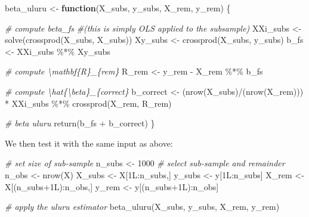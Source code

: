 \documentclass[
  12pt,
]{style/krantz}
\newenvironment{Shaded}{\begin{snugshade}}{\end{snugshade}}
\newcommand{\CommentTok}[1]{\textcolor[rgb]{0.56,0.35,0.01}{\textit{#1}}}
\newcommand{\ControlFlowTok}[1]{\textcolor[rgb]{0.13,0.29,0.53}{\textbf{#1}}}
\newcommand{\DecValTok}[1]{\textcolor[rgb]{0.00,0.00,0.81}{#1}}
\newcommand{\FunctionTok}[1]{\textcolor[rgb]{0.00,0.00,0.00}{#1}}
\newcommand{\NormalTok}[1]{#1}
\newcommand{\OtherTok}[1]{\textcolor[rgb]{0.56,0.35,0.01}{#1}}
\newcommand{\SpecialCharTok}[1]{\textcolor[rgb]{0.00,0.00,0.00}{#1}}
\begin{document}
\begin{Shaded}
\begin{Highlighting}[]
\NormalTok{beta\_uluru }\OtherTok{\textless{}{-}}
     \ControlFlowTok{function}\NormalTok{(X\_subs, y\_subs, X\_rem, y\_rem) \{}
          
          \CommentTok{\# compute beta\_fs }
          \CommentTok{\#(this is simply OLS applied to the subsample)}
\NormalTok{          XXi\_subs }\OtherTok{\textless{}{-}} \FunctionTok{solve}\NormalTok{(}\FunctionTok{crossprod}\NormalTok{(X\_subs, X\_subs))}
\NormalTok{          Xy\_subs }\OtherTok{\textless{}{-}} \FunctionTok{crossprod}\NormalTok{(X\_subs, y\_subs)}
\NormalTok{          b\_fs }\OtherTok{\textless{}{-}}\NormalTok{ XXi\_subs  }\SpecialCharTok{\%*\%}\NormalTok{ Xy\_subs}
          
          \CommentTok{\# compute \textbackslash{}mathbf\{R\}\_\{rem\}}
\NormalTok{          R\_rem }\OtherTok{\textless{}{-}}\NormalTok{ y\_rem }\SpecialCharTok{{-}}\NormalTok{ X\_rem }\SpecialCharTok{\%*\%}\NormalTok{ b\_fs}
          
          \CommentTok{\# compute \textbackslash{}hat\{\textbackslash{}beta\}\_\{correct\}}
\NormalTok{          b\_correct }\OtherTok{\textless{}{-}} 
\NormalTok{               (}\FunctionTok{nrow}\NormalTok{(X\_subs)}\SpecialCharTok{/}\NormalTok{(}\FunctionTok{nrow}\NormalTok{(X\_rem))) }\SpecialCharTok{*}
\NormalTok{               XXi\_subs }\SpecialCharTok{\%*\%} \FunctionTok{crossprod}\NormalTok{(X\_rem, R\_rem)}

          \CommentTok{\# beta uluru       }
          \FunctionTok{return}\NormalTok{(b\_fs }\SpecialCharTok{+}\NormalTok{ b\_correct)}
\NormalTok{     \}}
\end{Highlighting}
\end{Shaded}

We then test it with the same input as above:

\begin{Shaded}
\begin{Highlighting}[]
\CommentTok{\# set size of sub{-}sample}
\NormalTok{n\_subs }\OtherTok{\textless{}{-}} \DecValTok{1000}
\CommentTok{\# select sub{-}sample and remainder}
\NormalTok{n\_obs }\OtherTok{\textless{}{-}} \FunctionTok{nrow}\NormalTok{(X)}
\NormalTok{X\_subs }\OtherTok{\textless{}{-}}\NormalTok{ X[1L}\SpecialCharTok{:}\NormalTok{n\_subs,]}
\NormalTok{y\_subs }\OtherTok{\textless{}{-}}\NormalTok{ y[1L}\SpecialCharTok{:}\NormalTok{n\_subs]}
\NormalTok{X\_rem }\OtherTok{\textless{}{-}}\NormalTok{ X[(n\_subs}\SpecialCharTok{+}\NormalTok{1L)}\SpecialCharTok{:}\NormalTok{n\_obs,]}
\NormalTok{y\_rem }\OtherTok{\textless{}{-}}\NormalTok{ y[(n\_subs}\SpecialCharTok{+}\NormalTok{1L)}\SpecialCharTok{:}\NormalTok{n\_obs]}

\CommentTok{\# apply the uluru estimator}
\FunctionTok{beta\_uluru}\NormalTok{(X\_subs, y\_subs, X\_rem, y\_rem)}
\end{Highlighting}
\end{Shaded}
\end{document}
